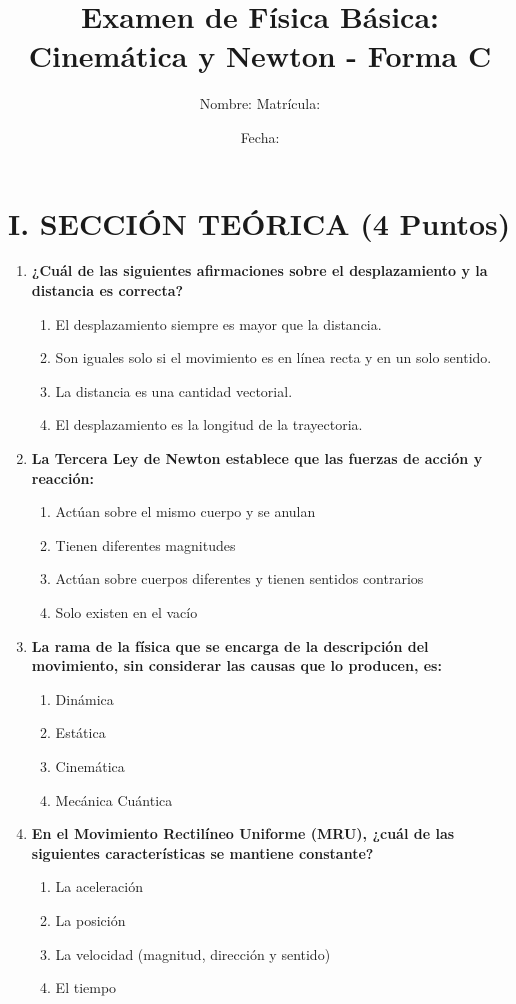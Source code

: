 \documentclass[12pt]{article}
\title{Examen de Física Básica: Cinemática y Newton - Forma C}
\author{Nombre: \underline{\hspace{8cm}} \quad Matrícula: \underline{\hspace{3cm}}}
\date{Fecha: \underline{\hspace{4cm}}}
\begin{document}
\maketitle

\section*{I. SECCIÓN TEÓRICA (4 Puntos)}

\begin{enumerate}[label=\arabic*.]
    \item \textbf{¿Cuál de las siguientes afirmaciones sobre el desplazamiento y la distancia es correcta?}
    \begin{enumerate}[label=\alph*)]
        \item El desplazamiento siempre es mayor que la distancia.
        \item Son iguales solo si el movimiento es en línea recta y en un solo sentido.
        \item La distancia es una cantidad vectorial.
        \item El desplazamiento es la longitud de la trayectoria.
    \end{enumerate}

    \item \textbf{La Tercera Ley de Newton establece que las fuerzas de acción y reacción:}
    \begin{enumerate}[label=\alph*)]
        \item Actúan sobre el mismo cuerpo y se anulan
        \item Tienen diferentes magnitudes
        \item Actúan sobre cuerpos diferentes y tienen sentidos contrarios
        \item Solo existen en el vacío
    \end{enumerate}

    \item \textbf{La rama de la física que se encarga de la descripción del movimiento, sin considerar las causas que lo producen, es:}
    \begin{enumerate}[label=\alph*)]
        \item Dinámica
        \item Estática
        \item Cinemática
        \item Mecánica Cuántica
    \end{enumerate}

    \item \textbf{En el Movimiento Rectilíneo Uniforme (MRU), ¿cuál de las siguientes características se mantiene constante?}
    \begin{enumerate}[label=\alph*)]
        \item La aceleración
        \item La posición
        \item La velocidad (magnitud, dirección y sentido)
        \item El tiempo
    \end{enumerate}
\end{enumerate}
\end{document}

